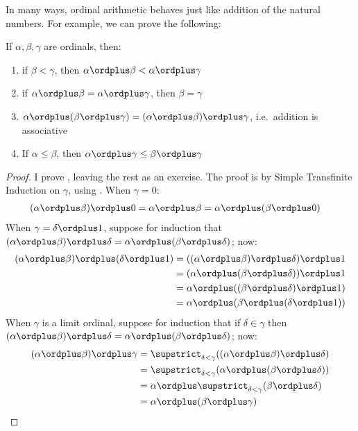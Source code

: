 \documentclass[../../../include/open-logic-section]{subfiles}
\begin{document}
In many ways, ordinal arithmetic behaves just like addition of the natural numbers. For example, we can prove the following:
\begin{lem}
	If $\alpha, \beta, \gamma$ are ordinals, then:
	\begin{enumerate}
		\item{} if $\beta < \gamma$, then $\alpha \ordplus  \beta < \alpha \ordplus  \gamma$
		\item{} if $\alpha \ordplus  \beta = \alpha\ordplus \gamma$, then $\beta = \gamma$
		\item{}  $\alpha \ordplus  (\beta \ordplus  \gamma) = (\alpha \ordplus  \beta) \ordplus  \gamma$, i.e.\ addition is associative
		\item{}  If $\alpha \leq \beta$, then $\alpha \ordplus  \gamma \leq \beta \ordplus  \gamma$
	\end{enumerate}
\end{lem}
\begin{proof}
	I prove , leaving the rest as an exercise. The proof is by Simple Transfinite Induction on $\gamma$, using . When $\gamma = 0$:
			\begin{align*}
				(\alpha \ordplus  \beta) \ordplus  0 &= \alpha \ordplus  \beta  = \alpha \ordplus  (\beta \ordplus  0)
			\end{align*}		
			When $\gamma = \delta\ordplus 1$, suppose for induction that $(\alpha \ordplus  \beta) \ordplus  \delta = \alpha \ordplus  (\beta \ordplus  \delta)$; now:
			\begin{align*}
				(\alpha \ordplus  \beta) \ordplus  (\delta \ordplus  1) & = ((\alpha \ordplus  \beta) \ordplus  \delta)\ordplus 1\\
				& = (\alpha \ordplus  (\beta \ordplus  \delta)) \ordplus  1\\
				& = \alpha \ordplus  ((\beta \ordplus  \delta)\ordplus 1)\\
				& = \alpha \ordplus  (\beta \ordplus  (\delta\ordplus 1))
			\end{align*}	
			When $\gamma$ is a limit ordinal, suppose for induction that if $\delta \in \gamma$ then $(\alpha \ordplus  \beta) \ordplus  \delta = \alpha \ordplus  (\beta \ordplus  \delta)$; now:
			\begin{align*}
				(\alpha \ordplus  \beta) \ordplus  \gamma & = \supstrict_{\delta < \gamma}((\alpha \ordplus  \beta) \ordplus  \delta) \\
				&= \supstrict_{\delta < \gamma}(\alpha \ordplus  (\beta \ordplus  \delta))\\
					&= \alpha \ordplus  \supstrict_{\delta < \gamma}(\beta \ordplus  \delta)\\
				& = \alpha \ordplus  (\beta \ordplus  \gamma)
			\end{align*}
\end{proof}\noindent 
\end{document}
